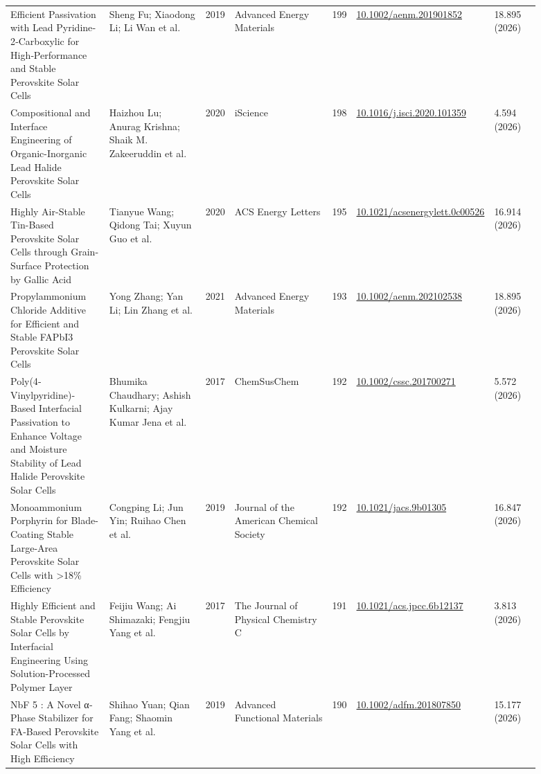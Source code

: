\documentclass[10pt,a4paper]{article}
\begin{document}
{\begin{longtable}{p{0.197\linewidth}p{0.197\linewidth}p{0.043\linewidth}p{0.197\linewidth}p{0.043\linewidth}p{0.117\linewidth}p{0.098\linewidth}}
Efficient Passivation with Lead Pyridine‐2‐Carboxylic for High‐Performance and Stable Perovskite Solar Cells & Sheng Fu; Xiaodong Li; Li Wan et al. & 2019 & Advanced Energy Materials & 199 & \href{https://doi.org/10.1002/aenm.201901852}{10.1002/aenm.201901852} & 18.895 (2026) \\
Compositional and Interface Engineering of Organic-Inorganic Lead Halide Perovskite Solar Cells & Haizhou Lu; Anurag Krishna; Shaik M. Zakeeruddin et al. & 2020 & iScience & 198 & \href{https://doi.org/10.1016/j.isci.2020.101359}{10.1016/j.isci.2020.101359} & 4.594 (2026) \\
Highly Air-Stable Tin-Based Perovskite Solar Cells through Grain-Surface Protection by Gallic Acid & Tianyue Wang; Qidong Tai; Xuyun Guo et al. & 2020 & ACS Energy Letters & 195 & \href{https://doi.org/10.1021/acsenergylett.0c00526}{10.1021/acsenergylett.0c00526} & 16.914 (2026) \\
Propylammonium Chloride Additive for Efficient and Stable FAPbI3 Perovskite Solar Cells & Yong Zhang; Yan Li; Lin Zhang et al. & 2021 & Advanced Energy Materials & 193 & \href{https://doi.org/10.1002/aenm.202102538}{10.1002/aenm.202102538} & 18.895 (2026) \\
Poly(4‐Vinylpyridine)‐Based Interfacial Passivation to Enhance Voltage and Moisture Stability of Lead Halide Perovskite Solar Cells & Bhumika Chaudhary; Ashish Kulkarni; Ajay Kumar Jena et al. & 2017 & ChemSusChem & 192 & \href{https://doi.org/10.1002/cssc.201700271}{10.1002/cssc.201700271} & 5.572 (2026) \\
Monoammonium Porphyrin for Blade-Coating Stable Large-Area Perovskite Solar Cells with >18\% Efficiency & Congping Li; Jun Yin; Ruihao Chen et al. & 2019 & Journal of the American Chemical Society & 192 & \href{https://doi.org/10.1021/jacs.9b01305}{10.1021/jacs.9b01305} & 16.847 (2026) \\
Highly Efficient and Stable Perovskite Solar Cells by Interfacial Engineering Using Solution-Processed Polymer Layer & Feijiu Wang; Ai Shimazaki; Fengjiu Yang et al. & 2017 & The Journal of Physical Chemistry C & 191 & \href{https://doi.org/10.1021/acs.jpcc.6b12137}{10.1021/acs.jpcc.6b12137} & 3.813 (2026) \\
NbF 5 : A Novel α‐Phase Stabilizer for FA‐Based Perovskite Solar Cells with High Efficiency & Shihao Yuan; Qian Fang; Shaomin Yang et al. & 2019 & Advanced Functional Materials & 190 & \href{https://doi.org/10.1002/adfm.201807850}{10.1002/adfm.201807850} & 15.177 (2026) \\

\end{longtable}}
\end{document}
